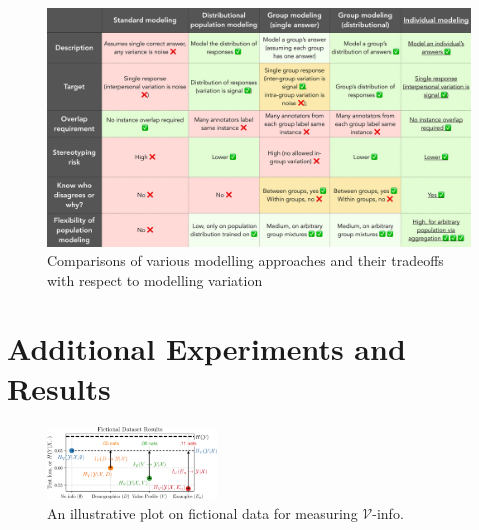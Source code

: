 \documentclass[11pt]{article}
\begin{document}
\begin{figure}[h]
\centering
\includegraphics[width=\textwidth]{files/modelingvariation.pdf}
\caption{Comparisons of various modelling approaches and their tradeoffs with respect to modelling variation}
\label{fig:modellingvariation}
\end{figure}


\section{Additional Experiments and Results}
\label{app:additionalexperiments}


\begin{figure}
\centering
\includegraphics[width=0.4\textwidth]{files/annotated_example_v2.pdf}
\small
\caption{
An illustrative plot on fictional data for measuring $\mathcal{V}$-info.
}
\label{fig:example}
\end{figure}
\end{document}
